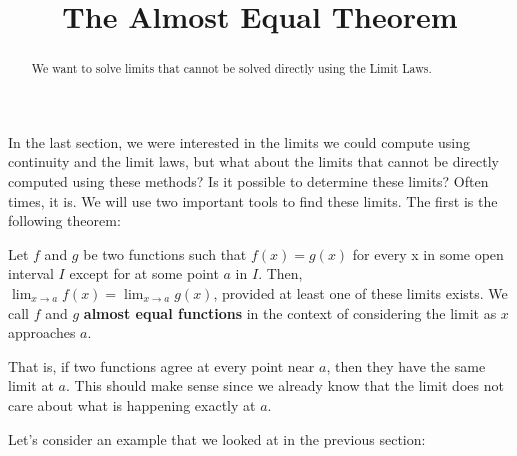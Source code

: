\documentclass{ximera}
\title{The Almost Equal Theorem}
\begin{document}
\begin{abstract}
  We want to solve limits that cannot be solved directly using the
  Limit Laws.
\end{abstract}

\maketitle


In the last section, we were interested in the limits we could compute
using continuity and the limit laws, but what about the limits that
cannot be directly computed using these methods?  Is it possible to
determine these limits?  Often times, it is.  We will use two
important tools to find these limits.  The first is the following
theorem:

\begin{theorem}
Let $f$ and $g$ be two functions such that $f(x)=g(x)$ for every x in
some open interval $I$ except for at some point $a$ in $I$.  Then,
$\lim_{x\to a} f(x)= \lim_{x\to a} g(x)$, provided at least one of
these limits exists.  We call $f$ and $g$ \textbf{almost equal
  functions} in the context of considering the limit as $x$ approaches
$a$.
\end{theorem}

That is, if two functions agree at every point near $a$, then they
have the same limit at $a$.  This should make sense since we already
know that the limit does not care about what is happening exactly at
$a$.

Let's consider an example that we looked at in the previous section:
\end{document}
